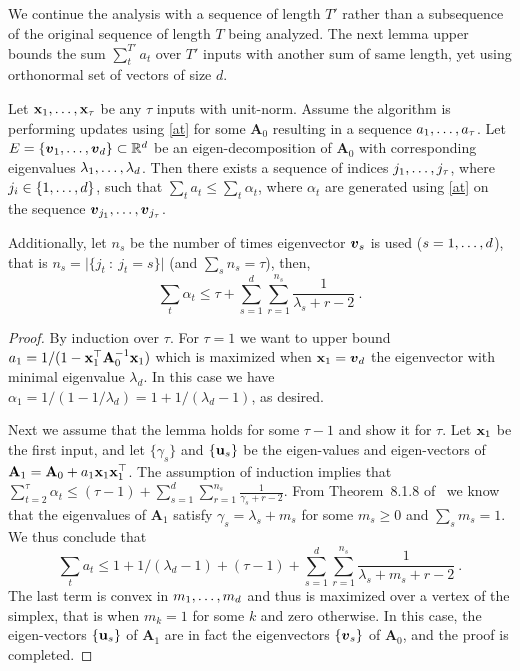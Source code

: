 We continue the analysis with a sequence of length
$T'$ rather than a subsequence of the original sequence of length $T$ being analyzed.
The next lemma upper bounds the sum $\sum_t^{T'} a_t$ over $T'$
inputs with another sum of same length, yet using orthonormal set of
vectors of size $d$.
\begin{lemma}
  Let $\mathbf{x}_{1} , \ldots ,  \mathbf{x}_{\tau}$ be any $\tau$ inputs with
  unit-norm. Assume the algorithm is performing updates using
  \eqref{at} for some $\mathbf{A}_0$ resulting in a sequence $a_1
  , \ldots ,  a_\tau$. Let $E = \{ {\boldsymbol{v}}_{1} , \ldots ,  {\boldsymbol{v}}_{d} \} \subset\mathbb{R}^d$ be
  an eigen-decomposition of $\mathbf{A}_0$ with corresponding
  eigenvalues $\lambda_1 , \ldots ,  \lambda_d$. Then there exists a
  sequence of indices $j_1 , \ldots ,  j_\tau$, where $j_i \in \{ 1 , \ldots ,  d\}$, such that
  $\sum_t a_t \leq \sum_t \alpha_t$, where $\alpha_t$ are generated
  using \eqref{at} on the sequence ${\boldsymbol{v}}_{j_1}
  , \ldots ,  {\boldsymbol{v}}_{j_\tau}$.

Additionally, let $n_s$ be the number of times
  eigenvector ${\boldsymbol{v}}_{s}$ is used ($s=1 , \ldots ,  d$), that is $n_s = \vert \{ j_t ~:~
  j_t=s\} \vert$ (and $\sum_s n_s = \tau$), then,
\[
\sum_t \alpha_t \leq \tau + \sum_{s=1}^d \sum_{r=1}^{n_s}
\frac{1}{\lambda_s+r-2} ~.
\]
\label{lem:worst_sequence}
\end{lemma}
\begin{proof}
By induction over $\tau$. For $\tau=1$ we want to upper bound $a_1 =
1/(1-{\mathbf{x}}^{\top}_{1} \mathbf{A}_0^{-1} \mathbf{x}_{1})$ which is maximized when
$\mathbf{x}_{1}={\boldsymbol{v}}_{d}$ the eigenvector with minimal eigenvalue $\lambda_d$.
In this case we have $\alpha_1 = 1/(1-1/\lambda_d) =
1+1/(\lambda_d-1)$, as desired.

Next we assume that the lemma holds
for some $\tau-1$ and show it for $\tau$. Let $\mathbf{x}_{1}$ be the first
input, and let $\{\gamma_s\}$ and $\{\mathbf{u}_{s}\}$ be the eigen-values and
eigen-vectors of
$\mathbf{A}_1 = \mathbf{A}_0 + a_1 \mathbf{x}_{1}{\mathbf{x}}^{\top}_{1}$. The assumption of induction implies that $\sum_{t=2}^\tau \alpha_t \leq (\tau-1) + \sum_{s=1}^d \sum_{r=1}^{n_s}
\frac{1}{\gamma_s+r-2}$. From Theorem~8.1.8 of~\cite{Golub:1996:MC:248979} we know that the
eigenvalues of $\mathbf{A}_1$ satisfy $\gamma_s = \lambda_s + m_s$ for some $m_s\geq 0$ and
$\sum_s m_s =1$. We thus conclude that
\[
\sum_t a_t \leq 1+1/(\lambda_d-1) +  (\tau-1) + \sum_{s=1}^d \sum_{r=1}^{n_s}
\frac{1}{\lambda_s + m_s + r-2} ~.
\]
The last term is convex in $m_1 , \ldots , m_d$ and thus is maximized over a
vertex of the simplex, that is when $m_k=1$ for some $k$ and zero
otherwise. In this case, the eigen-vectors $\{\mathbf{u}_{s}\}$ of
$\mathbf{A}_1$ are in fact the eigenvectors $\{ {\boldsymbol{v}}_{s} \}$
of $\mathbf{A}_0$, and the proof is completed.
\QED
\end{proof}

